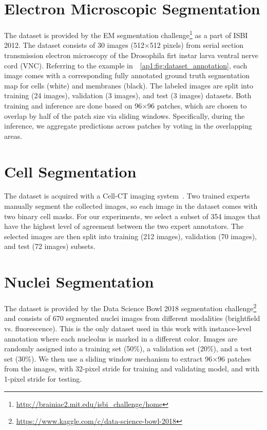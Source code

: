 \section*{Electron Microscopic Segmentation}
\label{ap1:electron_microscopic_segmentation}

The dataset is provided by the EM segmentation challenge\footnote{\href{http://brainiac2.mit.edu/isbi_challenge/home}{http://brainiac2.mit.edu/isbi\_challenge/home}}\citep{cardona2010integrated} as a part of ISBI 2012. The dataset consists of 30 images (512$\times$512 pixels) from serial section transmission electron microscopy of the Drosophila firt instar larva ventral nerve cord (VNC). Referring to the example in~\figurename~\ref{ap1:fig:dataset_annotation}, each image comes with a corresponding fully annotated ground truth segmentation map for cells (white) and membranes (black). The labeled images are split into training (24 images), validation (3 images), and test (3 images) datasets. 
Both training and inference are done based on 96$\times$96 patches, which are chosen to overlap by half of the patch size via sliding windows. Specifically, during the inference, we aggregate predictions across patches by voting in the overlapping areas.


\section*{Cell Segmentation}
\label{ap1:cell_segmentation}

The dataset is acquired with a Cell-CT imaging system~\citep{meyer2015cell}. Two trained experts manually segment the collected images, so each image in the dataset comes with two binary cell masks. For our experiments, we select a subset of 354 images that have the highest level of agreement between the two expert annotators. The selected images are then split into training (212 images), validation (70 images), and test (72 images) subsets.

\section*{Nuclei Segmentation}
\label{ap1:nuclei_segmentation}

The dataset is provided by the Data Science Bowl 2018 segmentation challenge\footnote{\href{https://www.kaggle.com/c/data-science-bowl-2018}{https://www.kaggle.com/c/data-science-bowl-2018}} and consists of 670 segmented nuclei images from different modalities (brightfield vs. fluorescence). This is the only dataset used in this work with instance-level annotation where each nucleolus is marked in a different color. Images are randomly assigned into a training set (50\%), a validation set (20\%), and a test set (30\%). We then use a sliding window mechanism to extract 96$\times$96 patches from the images, with 32-pixel stride for training and validating model, and with 1-pixel stride for testing. 


